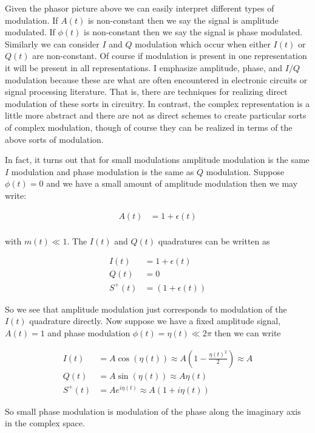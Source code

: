 \documentclass[12pt]{article}
\begin{document}
Given the phasor picture above we can easily interpret different types of modulation. If $A(t)$ is non-constant then we say the signal is amplitude modulated. If $\phi(t)$ is non-constant then we say the signal is phase modulated. Similarly we can consider $I$ and $Q$ modulation which occur when either $I(t)$ or $Q(t)$ are non-constant. Of course if modulation is present in one representation it will be present in all representations. I emphasize amplitude, phase, and $I/Q$ modulation because these are what are often encountered in electronic circuits or signal processing literature. That is, there are techniques for realizing direct modulation of these sorts in circuitry. In contrast, the complex representation is a little more abstract and there are not as direct schemes to create particular sorts of complex modulation, though of course they can be realized in terms of the above sorts of modulation.

In fact, it turns out that for small modulations amplitude modulation is the same $I$ modulation and phase modulation is the same as $Q$ modulation. Suppose $\phi(t)=0$ and  we have a small amount of amplitude modulation then we may write:

\begin{align}
A(t) &= 1 + \epsilon(t)\\
\end{align}

with $m(t) \ll 1$. The $I(t)$ and $Q(t)$ quadratures can be written as

\begin{align}
I(t) &= 1 + \epsilon(t)\\
Q(t) &= 0\\
S^+(t) &= (1+\epsilon(t))
\end{align}

So we see that amplitude modulation just corresponds to modulation of the $I(t)$ quadrature directly. Now suppose we have a fixed amplitude signal, $A(t)=1$ and phase modulation $\phi(t) = \eta(t) \ll 2\pi$ then we can write 

\begin{align}
I(t) &= A\cos(\eta(t)) \approx A\left(1-\frac{\eta(t)^2}{2}\right) \approx A\\
Q(t) &= A\sin(\eta(t)) \approx A\eta(t)\\
S^+(t) &= Ae^{i\eta(t)} \approx A(1+i\eta(t))
\end{align}

So small phase modulation is modulation of the phase along the imaginary axis in the complex space.
\end{document}

